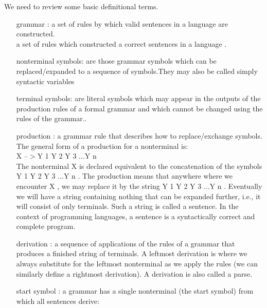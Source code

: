 We need to review some basic  definitional terms.
\begin{enumerate}
\item [grammar :] a set of rules by which valid sentences in a language are constructed.\\

a set of rules which constructed a correct sentences in a language .\\

\item [nonterminal symbols:] are those grammar symbols which can be replaced/expanded to a sequence of symbols.They may also be called simply syntactic variables\\



\item [terminal symbols:]  are literal symbols which may appear in the outputs of the production rules of a formal grammar and which cannot be changed using the rules of the grammar..\\

\item [production :] a grammar rule that describes how to replace/exchange symbols. The general form of a production for a nonterminal is:\\



X –$>$Y 1 Y 2 Y 3 ...Y n\\

The nonterminal X is declared equivalent to the concatenation of the symbols Y 1 Y 2 Y 3 ...Y n . The production means that anywhere where we encounter X , we may replace it by the string Y 1 Y 2 Y 3 ...Y n . Eventually we will have a string containing nothing that can be expanded further, i.e., it will consist of only terminals. Such a string is called a sentence. In the context of programming languages, a sentence is a syntactically correct and complete program.\\

\item [derivation :] a sequence of applications of the rules of a grammar that produces a finished string of terminals. A leftmost derivation is where we always substitute for the leftmost nonterminal as we apply the rules (we can similarly define a rightmost derivation). A derivation is also called a parse.\\

\item [start symbol :] a grammar has a single nonterminal (the start symbol) from which all sentences derive:\\


\end{enumerate}
